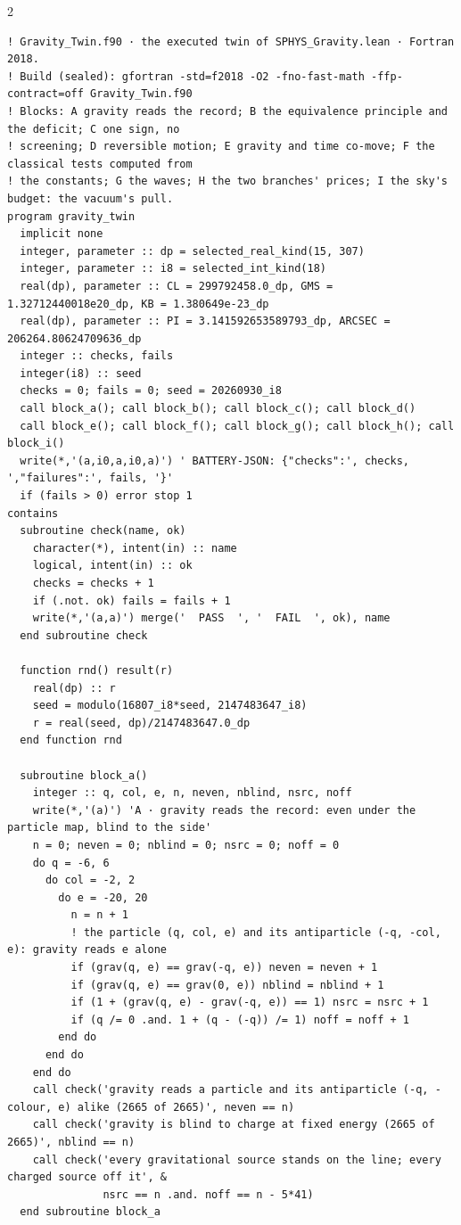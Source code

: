 \documentclass[10pt]{article}
\begin{document}
\begin{multicols}{2}
\begin{Verbatim}[fontsize=\fontsize{5.9}{6.8}\selectfont,breaklines,breakanywhere,breaksymbolleft={}]
! Gravity_Twin.f90 · the executed twin of SPHYS_Gravity.lean · Fortran 2018.
! Build (sealed): gfortran -std=f2018 -O2 -fno-fast-math -ffp-contract=off Gravity_Twin.f90
! Blocks: A gravity reads the record; B the equivalence principle and the deficit; C one sign, no
! screening; D reversible motion; E gravity and time co-move; F the classical tests computed from
! the constants; G the waves; H the two branches' prices; I the sky's budget: the vacuum's pull.
program gravity_twin
  implicit none
  integer, parameter :: dp = selected_real_kind(15, 307)
  integer, parameter :: i8 = selected_int_kind(18)
  real(dp), parameter :: CL = 299792458.0_dp, GMS = 1.32712440018e20_dp, KB = 1.380649e-23_dp
  real(dp), parameter :: PI = 3.141592653589793_dp, ARCSEC = 206264.80624709636_dp
  integer :: checks, fails
  integer(i8) :: seed
  checks = 0; fails = 0; seed = 20260930_i8
  call block_a(); call block_b(); call block_c(); call block_d()
  call block_e(); call block_f(); call block_g(); call block_h(); call block_i()
  write(*,'(a,i0,a,i0,a)') ' BATTERY-JSON: {"checks":', checks, ',"failures":', fails, '}'
  if (fails > 0) error stop 1
contains
  subroutine check(name, ok)
    character(*), intent(in) :: name
    logical, intent(in) :: ok
    checks = checks + 1
    if (.not. ok) fails = fails + 1
    write(*,'(a,a)') merge('  PASS  ', '  FAIL  ', ok), name
  end subroutine check

  function rnd() result(r)
    real(dp) :: r
    seed = modulo(16807_i8*seed, 2147483647_i8)
    r = real(seed, dp)/2147483647.0_dp
  end function rnd

  subroutine block_a()
    integer :: q, col, e, n, neven, nblind, nsrc, noff
    write(*,'(a)') 'A · gravity reads the record: even under the particle map, blind to the side'
    n = 0; neven = 0; nblind = 0; nsrc = 0; noff = 0
    do q = -6, 6
      do col = -2, 2
        do e = -20, 20
          n = n + 1
          ! the particle (q, col, e) and its antiparticle (-q, -col, e): gravity reads e alone
          if (grav(q, e) == grav(-q, e)) neven = neven + 1
          if (grav(q, e) == grav(0, e)) nblind = nblind + 1
          if (1 + (grav(q, e) - grav(-q, e)) == 1) nsrc = nsrc + 1
          if (q /= 0 .and. 1 + (q - (-q)) /= 1) noff = noff + 1
        end do
      end do
    end do
    call check('gravity reads a particle and its antiparticle (-q, -colour, e) alike (2665 of 2665)', neven == n)
    call check('gravity is blind to charge at fixed energy (2665 of 2665)', nblind == n)
    call check('every gravitational source stands on the line; every charged source off it', &
               nsrc == n .and. noff == n - 5*41)
  end subroutine block_a


\end{Verbatim}
\end{multicols}
\end{document}
